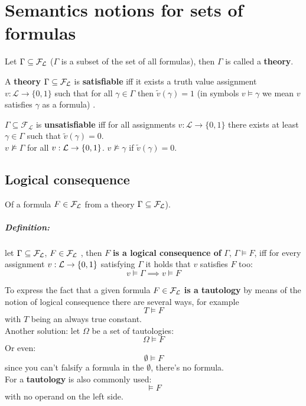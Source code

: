
	\chapter{Semantics notions for sets of formulas}

	Let $\Gamma \subseteq \mathcal{F}_\mathcal{L}$ ($\Gamma$ is a subset of the set of all formulas), then $\Gamma$ is called a \textbf{theory}.\\

	\begin{definition}
		A \textbf{theory} $\Gamma \subseteq \mathcal{F}_\mathcal{L}$ is \textbf{satisfiable} iff it exists a truth value assignment $v: \mathcal{L} \rightarrow \{0,1\}$ such that for all $\gamma \in \Gamma$ then $\tilde{v} (\gamma) = 1$ (in symbols $v \models \gamma$ we mean $v$ satisfies $\gamma$ as a formula) .\\
	\end{definition}

	\begin{definition}
		$\Gamma \subseteq \mathcal{F}_\mathcal{L}$ is \textbf{unsatisfiable} iff for all assignments $v: \mathcal{L} \rightarrow \{0,1\}$ there exists at least $\gamma \in \Gamma$ such that $\tilde{v} (\gamma) = 0$.\\
		
		$v \not \models \Gamma$ for all $v: \mathcal{L} \rightarrow \{0,1\}$. $v \not \models \gamma$ if $\tilde{v} (\gamma) = 0$.\\
	\end{definition}

	\newpage

	\section{Logical consequence}
	Of a formula $F \in \mathcal{F}_\mathcal{L}$ from a theory $\Gamma \subseteq \mathcal{F}_\mathcal{L}$).\\

	\paragraph{Definition:} let $\Gamma \subseteq \mathcal{F}_\mathcal{L}$, $F \in \mathcal{F}_\mathcal{L}$ , then $F$ \textbf{is a logical consequence of} $\Gamma$, $\Gamma \models F$, iff for every assignment $v: \mathcal{L} \rightarrow \{0,1\}$ satisfying $\Gamma$ it holds that $v$ satisfies $F$ too:
	$$ v \models \Gamma \implies v \models F $$

	\vfill

	To express the fact that a given formula $F \in \mathcal{F}_\mathcal{L}$ \textbf{is a tautology} by means of the notion of logical consequence there are several ways, for example
	$$ T \models F $$
	with $T$ being an always true constant.\\
	Another solution: let $\Omega$ be a set of tautologies:
	$$\Omega \models F$$
	Or even:
	$$ \emptyset \models F$$
	since you can't falsify a formula in the $\emptyset$, there's no formula.\\
	For a \textbf{tautology} is also commonly used:
	$$ \models F$$
	with no operand on the left side.\\

